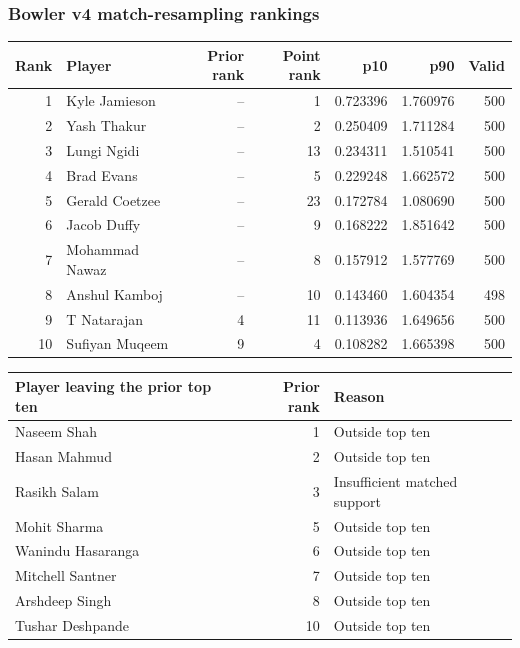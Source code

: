 \clearpage

\subsubsection*{Bowler v4 match-resampling rankings}

\begin{center}
\begin{tabularx}{\linewidth}{r>{\raggedright\arraybackslash}Xrrrrr}
\toprule
Rank & Player & Prior rank & Point rank & p10 & p90 & Valid \\
\midrule
1 & Kyle Jamieson & -- & 1 & 0.723396 & 1.760976 & 500 \\
2 & Yash Thakur & -- & 2 & 0.250409 & 1.711284 & 500 \\
3 & Lungi Ngidi & -- & 13 & 0.234311 & 1.510541 & 500 \\
4 & Brad Evans & -- & 5 & 0.229248 & 1.662572 & 500 \\
5 & Gerald Coetzee & -- & 23 & 0.172784 & 1.080690 & 500 \\
6 & Jacob Duffy & -- & 9 & 0.168222 & 1.851642 & 500 \\
7 & Mohammad Nawaz & -- & 8 & 0.157912 & 1.577769 & 500 \\
8 & Anshul Kamboj & -- & 10 & 0.143460 & 1.604354 & 498 \\
9 & T Natarajan & 4 & 11 & 0.113936 & 1.649656 & 500 \\
10 & Sufiyan Muqeem & 9 & 4 & 0.108282 & 1.665398 & 500 \\
\bottomrule
\end{tabularx}
\end{center}

\begin{center}
\begin{tabularx}{\linewidth}{>{\raggedright\arraybackslash}Xr>{\raggedright\arraybackslash}X}
\toprule
Player leaving the prior top ten & Prior rank & Reason \\
\midrule
Naseem Shah & 1 & Outside top ten \\
Hasan Mahmud & 2 & Outside top ten \\
Rasikh Salam & 3 & Insufficient matched support \\
Mohit Sharma & 5 & Outside top ten \\
Wanindu Hasaranga & 6 & Outside top ten \\
Mitchell Santner & 7 & Outside top ten \\
Arshdeep Singh & 8 & Outside top ten \\
Tushar Deshpande & 10 & Outside top ten \\
\bottomrule
\end{tabularx}
\end{center}

